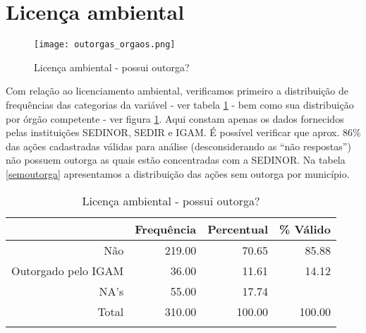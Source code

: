 \documentclass[a4paper, 12pt, openright, oneside, english, brazil, article]{abntex2}
\begin{document}
	
	\section{Licença ambiental}
	
	\begin{figure}[!h]
		\centering
		\caption{Licença ambiental - possui outorga?}
		\label{outorga-fig}
		\texttt{[image: outorgas\_orgaos.png]}
	\end{figure}
	
	Com relação ao licenciamento ambiental, verificamos primeiro a distribuição de frequências das categorias da variável - ver tabela \ref{outorga} - bem como sua distribuição por órgão competente - ver figura \ref{outorga-fig}. Aqui constam apenas os dados fornecidos pelas instituições SEDINOR, SEDIR e IGAM. É possível verificar que aprox. 86\% das ações cadastradas válidas para análise (desconsiderando as ``não respostas'') não possuem outorga as quais estão concentradas com a SEDINOR. Na tabela \ref{semoutorga} apresentamos a distribuição das ações sem outorga por município.
	
	

	\begin{scriptsize}
	\begin{longtable}{rrrr}
		\caption{Licença ambiental - possui outorga?} \\ 
		\hline
		& Frequência & Percentual & \% Válido \\ 
		\hline
		Não & 219.00 & 70.65 & 85.88 \\ 
		Outorgado pelo IGAM & 36.00 & 11.61 & 14.12 \\ 
		NA's & 55.00 & 17.74 &  \\ 
		Total & 310.00 & 100.00 & 100.00 \\ 
		\hline
		\hline
		\label{outorga}
	\end{longtable}
	\end{scriptsize}
\end{document}
